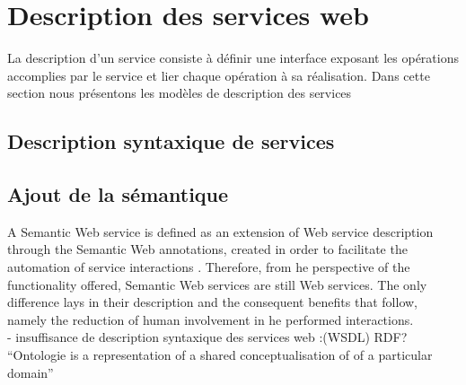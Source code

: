 
     \newpage

\section{Description des services web} 
    La description d’un service consiste à définir une interface exposant les opérations accomplies par le service et 
    lier chaque opération à sa réalisation. Dans cette section nous présentons les modèles de description des services
    	\subsection{Description syntaxique de services}
        \subsection{Ajout de la sémantique}
	    A Semantic Web service is defined as an extension of Web service description through the Semantic Web annotations,
	    created in order to facilitate the automation of service interactions . Therefore, from 
	    he perspective of the functionality offered, Semantic Web services are still Web services. The only difference lays
	    in their description and the consequent benefits that follow, namely the reduction of human involvement in 
	    he performed interactions.\\

	    - insuffisance de description syntaxique des services web :(WSDL)
	     RDF? \cite{lassila1999resource}\\
	    ``Ontologie is a representation of a shared conceptualisation of of a particular domain'' 

